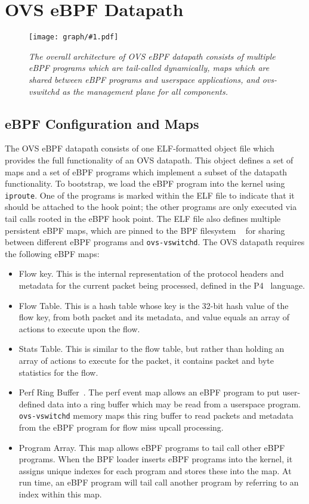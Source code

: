 \documentclass[10pt]{sigplanconf}
\newcommand{\myfigcross}[3]
{
\begin{figure*}[ht]
\centerline{\texttt{[image: graph/\#1.pdf]}}
\caption{\sl \small #3}
\label{#1:fig}
\vspace*{-0.15in}
\end{figure*}
}
\begin{document}
\section{OVS eBPF Datapath}
\label{sec:ebpf}
\myfigcross{ovsebpf}{5.5in}{The overall architecture of OVS eBPF datapath
consists of multiple eBPF programs which are tail-called dynamically, maps
which are shared between eBPF programs and userspace applications, and
ovs-vswitchd as the management plane for all components.}

\subsection{eBPF Configuration and Maps}
The OVS eBPF datapath consists of one ELF-formatted object file which provides
the full functionality of an OVS datapath. This object defines
a set of maps and a set of eBPF programs which implement a subset of
the datapath functionality.  To bootstrap, we load the eBPF program into
the kernel using \verb+iproute+. One of the programs is marked
within the ELF file to indicate that it should be
attached to the hook point; the other programs are only executed via tail
calls rooted in the eBPF hook point.  The ELF file also defines multiple persistent eBPF maps, which are
pinned to the BPF filesystem ~\cite{bpfpmap}
for sharing between different eBPF programs and \verb+ovs-vswitchd+.
The OVS datapath requires the following eBPF maps:
\begin{itemize}
\item Flow key. This is the internal representation of the protocol headers
    and metadata for the current packet being processed, defined in the P4~\cite{p4} language.
\item Flow Table. This is a hash table whose key is the 32-bit hash value
of the flow key, from both packet and its metadata,
and value equals an array of actions to execute upon the flow.
\item Stats Table. This is similar to the flow table, but rather than holding
an array of actions to execute for the packet, it contains packet and byte
statistics for the flow.
\item Perf Ring Buffer~\cite{ebpfperf,ebpfperf2}. The perf event map
allows an eBPF program to put user-defined data into a ring buffer which
may be read from a userspace program. \verb+ovs-vswitchd+ memory maps
this ring buffer to read packets and metadata from the eBPF program for
flow miss upcall processing.
\item Program Array. This map allows eBPF programs to tail call other eBPF
programs. When the BPF loader inserts eBPF programs into the kernel, it assigns
unique indexes for each program and stores these into the map.  At run time,
an eBPF program will tail call another program by referring to an index within
this map.
\end{itemize}
\end{document}
